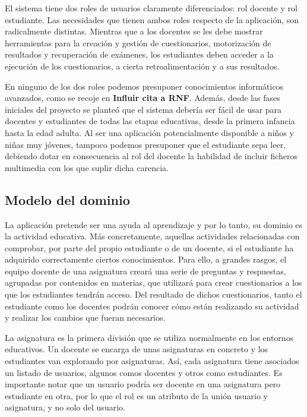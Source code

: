 
El sistema tiene dos roles de usuarios claramente diferenciados: rol docente y rol estudiante. Las necesidades que tienen ambos roles respecto de la aplicación, son radicalmente distintas. Mientras que a los docentes se les debe mostrar herramientas para la creación y gestión de cuestionarios, motorización de resultados y recuperación de exámenes, los estudiantes deben acceder a la ejecución de los cuestionarios, a cierta retroalimentación y a sus resultados.

En ninguno de los dos roles podemos presuponer conocimientos informáticos avanzados, como se recoje en \textbf{Influir cita a RNF}. Además, desde las fases iniciales del proyecto se planteó que el sistema debería ser fácil de usar para docentes y estudiantes de todas las etapas educativas, desde la primera infancia hasta la edad adulta. Al ser una aplicación potencialmente disponible a niños y niñas muy jóvenes, tampoco podemos presuponer que el estudiante sepa leer, debiendo dotar en consecuencia al rol del docente la habilidad de incluir ficheros multimedia con los que suplir dicha carencia.

\subsection{Modelo del dominio}

La aplicación pretende ser una ayuda al aprendizaje y por lo tanto, su dominio es la actividad educativa. Más concretamente, aquellas actividades relacionadas con comprobar, por parte del propio estudiante o de un docente, si el estudiante ha adquirido correctamente ciertos conocimientos. Para ello, a grandes rasgos, el equipo docente de una asignatura creará una serie de preguntas y respuestas, agrupadas por contenidos en materias, que utilizará para crear cuestionarios a los que los estudiantes tendrán acceso. Del resultado de dichos cuestionarios, tanto el estudiante como los docentes podrán conocer cómo están realizando su actividad y realizar los cambios que fueran necesarios.

La asignatura es la primera división que se utiliza normalmente en los entornos educativos. Un docente se encarga de unas asignaturas en concreto y los estudiantes van explorando por asignaturas. Así, cada asignatura tiene asociados un listado de usuarios, algunos comos docentes y otros como estudiantes. Es importante notar que un usuario podría ser docente en una asignatura pero estudiante en otra, por lo que el rol es un atributo de la unión usuario y asignatura, y no solo del usuario.

